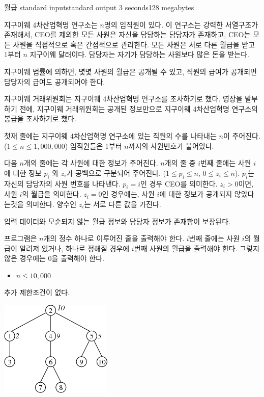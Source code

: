 \begin{problem}{월급}
	{standard input}{standard output}
	{3 seconds}{128 megabytes}{}
	
	지구이웨 4차산업혁명 연구소는 $n$명의 임직원이 있다. 이 연구소는 강력한 서열구조가 존재해서, CEO를 제외한 모든 사원은 자신을 담당하는 담당자가 존재하고, CEO는 모든 사원을 직접적으로 혹은 간접적으로 관리한다. 모든 사원은 서로 다른 월급을 받고 1부터 $n$ 지구이웨 달러이다. 담당자는 자기가 담당하는 사원보다 많은 돈을 받는다.
	
	지구이웨 법률에 의하면, 몇몇 사원의 월급은 공개될 수 있고, 직원의 급여가 공개되면 담당자의 급여도 공개되어야 한다.

	지구이웨 거래위원회는 지구이웨 4차산업혁명 연구소를 조사하기로 했다. 영장을 발부하기 전에, 지구이웨 거래위원회는 공개된 정보만으로 지구이웨 4차산업혁명 연구소의 봉급을 조사하기로 했다.

	\InputFile
	
	첫재 줄에는 지구이웨 4차산업혁명 연구소에 있는 직원의 수를 나타내는 $n$이 주어진다. ($1 \le n \le 1,000,000$) 임직원들은 1부터 $n$까지의 사원번호가 붙어있다.
	
	다음 $n$개의 줄에는 각 사원에 대한 정보가 주어진다. $n$개의 줄 중 $i$번째 줄에는 사원 $i$에 대한 정보 $p_i$ 와 $z_i$가 공백으로 구분되어 주어진다. ($1 \le p_i \le n$, $0 \le z_i \le n$). $p_i$는 자신의 담당자의 사원 번호를 나타낸다. $p_i = i$인 경우 CEO를 의미한다. $z_i>0$이면, 사원 $i$의 월급을 의미한다. $z_i=0$인 경우에는, 사원 $i$에 대한 정보가 공개되지 않았다는것을 의미한다. 양수인 $z_i$는 서로 다른 값을 가진다.
	
	입력 데이터와 모순되지 않는 월급 정보와 담당자 정보가 존재함이 보장된다.
 
 
	\OutputFile
	
	프로그램은 $n$개의 정수 하나로 이루어진 줄을 출력해야 한다. $i$번째 줄에는 사원 $i$의 월급이 알려져 있거나, 하나로 정해질 경우에 $i$번째 사원의 월급을 출력해야 한다. 그렇지 않은 경우에는 0을 출력해야 한다.

	\begin{itemize}
		\item $n \le 10,000$
	\end{itemize}
	
	
	추가 제한조건이 없다.

	\Examples
		
	\begin{example}
	\end{example}
	
	\Note
	
	\includegraphics[]{pen.png}
\end{problem}

